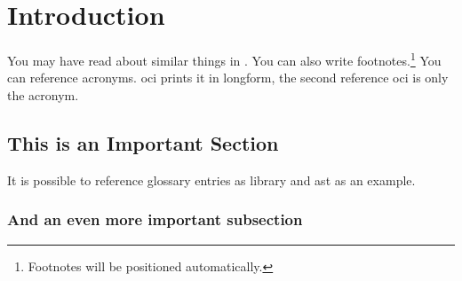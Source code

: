 \chapter{Introduction}
\label{ch:intro}

You may have read about similar things in \cite{Goodliffe2007}.
You can also write footnotes.\footnote{Footnotes will be positioned automatically.}
You can reference acronyms. \gls{oci} prints it in longform, the second reference \gls{oci} is only the acronym.

\blindtext

\blindtext

\section{This is an Important Section}
\label{sec:section}

It is possible to reference glossary entries as \gls{library} and \gls{ast} as an example.

\blindtext

\subsection{And an even more important subsection}
\label{sec:subsection}

\blindtext
